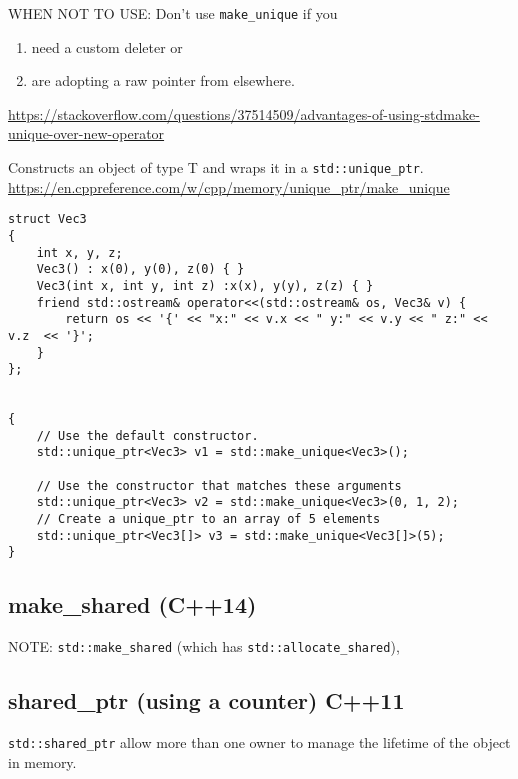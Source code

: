 WHEN NOT TO USE: Don't use \verb!make_unique! if  you
\begin{enumerate}
  \item  need a custom deleter or 
  
  \item are adopting a raw pointer from elsewhere.
  
\end{enumerate}
\url{https://stackoverflow.com/questions/37514509/advantages-of-using-stdmake-unique-over-new-operator}

Constructs an object of type T and wraps it in a \verb!std::unique_ptr!.
\url{https://en.cppreference.com/w/cpp/memory/unique_ptr/make_unique}

\begin{lstlisting}
struct Vec3
{
    int x, y, z;
    Vec3() : x(0), y(0), z(0) { }
    Vec3(int x, int y, int z) :x(x), y(y), z(z) { }
    friend std::ostream& operator<<(std::ostream& os, Vec3& v) {
        return os << '{' << "x:" << v.x << " y:" << v.y << " z:" << v.z  << '}';
    }
};


{
    // Use the default constructor.
    std::unique_ptr<Vec3> v1 = std::make_unique<Vec3>();
    
    // Use the constructor that matches these arguments
    std::unique_ptr<Vec3> v2 = std::make_unique<Vec3>(0, 1, 2);
    // Create a unique_ptr to an array of 5 elements
    std::unique_ptr<Vec3[]> v3 = std::make_unique<Vec3[]>(5);
}
\end{lstlisting}

\subsection{make\_shared (C++14)}
\label{sec:make_shared}


NOTE: \verb!std::make_shared! (which has \verb!std::allocate_shared!), 


\subsection{shared\_ptr (using a counter) C++11}
\label{sec:shared_ptr_C++11}

\verb!std::shared_ptr! allow more than one owner to manage the
lifetime of the object in memory.

